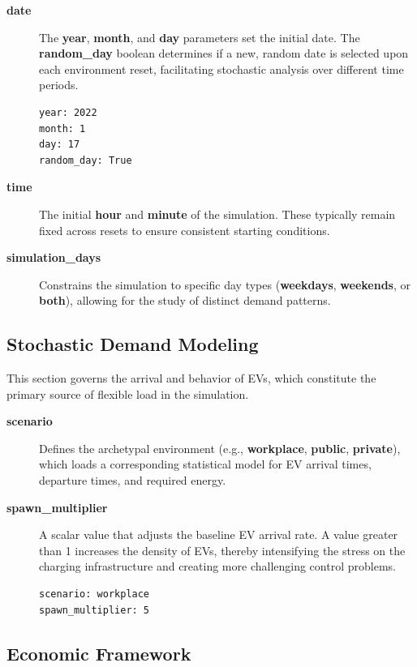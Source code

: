 \begin{description}
    \item[\textbf{\textbf{date}}] The \textbf{year}, \textbf{month}, and \textbf{day} parameters set the initial date. The \textbf{random\_day} boolean determines if a new, random date is selected upon each environment reset, facilitating stochastic analysis over different time periods.
    \begin{lstlisting}
year: 2022
month: 1
day: 17
random_day: True
    \end{lstlisting}

    \item[\textbf{\textbf{time}}] The initial \textbf{hour} and \textbf{minute} of the simulation. These typically remain fixed across resets to ensure consistent starting conditions.
    
    \item[\textbf{\textbf{simulation\_days}}] Constrains the simulation to specific day types (\textbf{weekdays}, \textbf{weekends}, or \textbf{both}), allowing for the study of distinct demand patterns.
\end{description}

\subsection{Stochastic Demand Modeling}

This section governs the arrival and behavior of EVs, which constitute the primary source of flexible load in the simulation.

\begin{description}
    \item[\textbf{\textbf{scenario}}] Defines the archetypal environment (e.g., \textbf{workplace}, \textbf{public}, \textbf{private}), which loads a corresponding statistical model for EV arrival times, departure times, and required energy.
    
    \item[\textbf{\textbf{spawn\_multiplier}}] A scalar value that adjusts the baseline EV arrival rate. A value greater than 1 increases the density of EVs, thereby intensifying the stress on the charging infrastructure and creating more challenging control problems.
    \begin{lstlisting}
scenario: workplace
spawn_multiplier: 5
    \end{lstlisting}
\end{description}

\subsection{Economic Framework}

